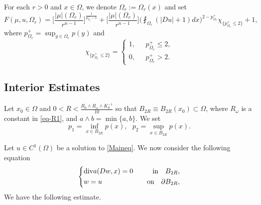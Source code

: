 \documentclass[a4paper,10pt]{amsart}
\newcommand{\f}{\frac}
\newcommand{\om}{\omega}
\newcommand{\Om}{\Omega}
\newcommand{\di}{{\rm div}}
\begin{document}
For each $r>0$ and $x\in \Om$, we denote $\Om_r:=\Om_r(x)$ and set
$$
F(\mu,u,\Om_r)=\Big[\f{|\mu|(\Om_{r})}{r^{n-1}}\Big]^{\f{1}{p_{\Om_r}^+-1}} +\Big[\f{|\mu|(\Om_{r})}{r^{n-1}}\Big]\Big(\fint_{\Om_r}(|Du|+1)dx\Big)^{2-p_{\Om_r}^+}\chi_{\{p_{\Om_r}^+\leq 2\}}+1,
$$
where $p_{\Om_r}^+=\sup_{y\in \Om_r}p(y)$ and
$$
\chi_{\{p_{\Om_r}^+\leq 2\}}=\begin{cases}
1, \ \ \ &p_{\Om_r}^+\leq 2,\\
0, \ \ \ &p_{\Om_r}^+> 2.
\end{cases}
$$
\subsection{Interior Estimates}\label{InEs}
Let $x_0\in \Om$ and $0<R<\f{R_0\wedge R_\om\wedge K_0^{-1}}{10}$ so that $B_{2R}\equiv B_{2R}(x_0)\subset \Om$, where $R_\omega$ is a constant in \eqref{eq-R1}, and $a\wedge b=\min\{a,b\}$. We set 
$$
p_1=\inf_{x\in B_{2R}}p(x), \ \ \ p_2=\sup_{x\in B_{2R}}p(x).
$$



Let $u\in C^1(\Om)$ be a solution to \eqref{Maineq}. We now consider the following equation
\begin{equation}\label{eq1-interior}
\left\{
\begin{aligned}
&\di a(Dw, x)=0 \quad &\text{in} \quad B_{2R},\\
&w=u  \quad &\text{on} \quad \partial B_{2R},
\end{aligned}
\right.
\end{equation}
We have the following estimate.
\end{document}
